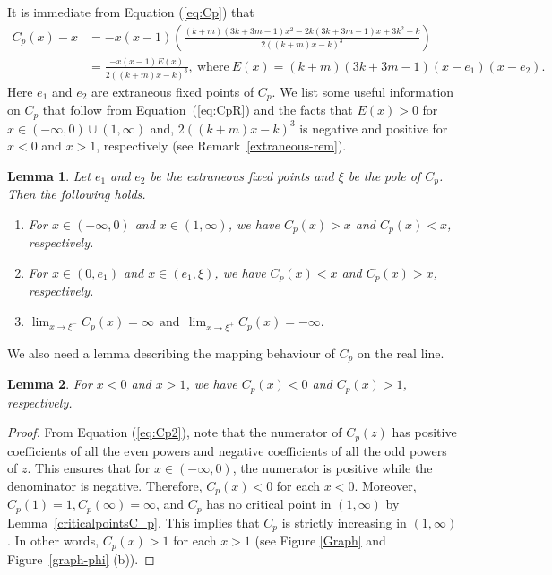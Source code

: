 \documentclass[12pt]{article}
\newtheorem{lem}{Lemma}[section]
\begin{document}
It is immediate from Equation (\ref*{eq:Cp}) that
\begin{align}
	C_p(x)-x &=-x(x-1)\left(\frac{(k+m)\left(3k+3m-1\right) x^2-2k\left(3k+3m-1\right)x+3k^2-k}{2\left((k+m)x-k\right)^3}\right) \nonumber \\
	&=\frac{-x(x-1)E(x)}{2\left((k+m)x-k\right)^3}, ~\mbox{where}~  E(x)= (k+m)\left(3k+3m-1\right)(x-e_1)(x-e_2).
  \label{eq:CpR}
\end{align}
 Here $e_1$ and $ e_2 $ are extraneous fixed points of $C_p$. We list some useful information on $C_p$ that follow from Equation~(\ref{eq:CpR}) and the facts that $E(x)>0$ for $x \in (-\infty,0)\cup (1,\infty)$ and, $2\left((k+m)x-k\right)^3$ is negative and positive for $x<0$ and $x>1$, respectively (see Remark~\ref{extraneous-rem}).
 
 \begin{lem} Let $ e_1$ and $ e_2$ be the extraneous fixed points and $\xi$ be the pole of $C_p$. Then the following holds.
 	\begin{enumerate}
 		\item For $x \in (-\infty,0)$ and $x \in (1,\infty)$, we have $ C_p(x)>x$ and $C_p (x)<x$, respectively.
 		\item For $x \in (0, e_1)$ and $x \in (e_1, \xi)$, we have $ C_p(x)<x$ and $C_p (x)>x$, respectively.
 		\item $\lim_{x \to {\xi}^-}C_p(x)=\infty  ~~\text{and}~~\lim_{x \to {\xi}^+}C_p(x)=-\infty.$
 	\end{enumerate}
 	\label{C_p-real}
 \end{lem}   
 We also need a lemma describing the mapping behaviour of $C_p$ on the real line.
 \begin{lem}  For $x<0$ and $x>1$, we have $ C_p (x)<0$ and $C_p (x)>1$, respectively.
 \end{lem}
 \begin{proof}
 	 From Equation (\ref{eq:Cp2}), note that the numerator of $C_p(z)$ has positive coefficients of all the even powers and negative coefficients of all the odd powers  of $z$. This ensures that for $x \in (-\infty,0)$, the numerator is positive while the denominator is negative. Therefore, $C_p(x)<0$ for each $x < 0$. Moreover, $C_p(1)=1,C_p(\infty)=\infty$, and $C_p$ has no critical point in $(1,\infty)$ by Lemma~\ref{criticalpointsC_p}. This implies that $C_p$ is strictly increasing in $(1, \infty)$. In other words, $C_p (x)>1$ for each $x>1$ (see Figure \ref{Graph} and Figure~\ref{graph-phi} (b)).
 \end{proof}
\end{document}
